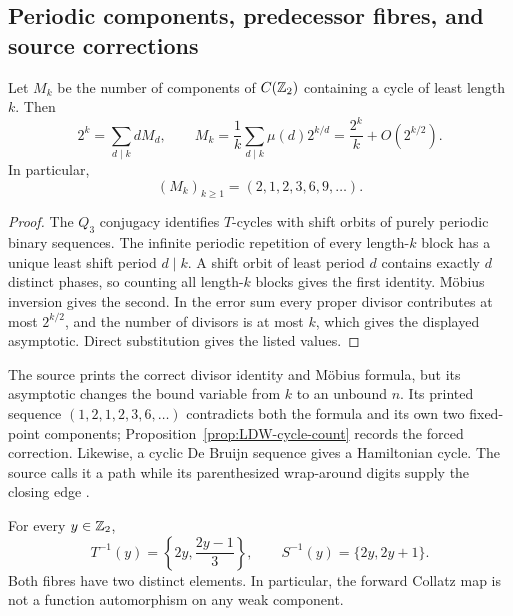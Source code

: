 \subsection{Periodic components, predecessor fibres, and source corrections}

\begin{proposition}
\label{prop:LDW-cycle-count}
Let $M_k$ be the number of components of $C(\mathbb{Z}_{2})$ containing a cycle of
least length $k$.  Then
\begin{equation}
\label{eq:LDW-cycle-count}
 2^k=\sum_{d\mid k}dM_d,
 \qquad
 M_k=\frac1k\sum_{d\mid k}\mu(d)2^{k/d}
 =\frac{2^k}{k}+O(2^{k/2}).
\end{equation}
In particular,
\[
 (M_k)_{k\geq1}=(2,1,2,3,6,9,\ldots).
\]
\end{proposition}

\begin{proof}
The $Q_3$ conjugacy identifies $T$-cycles with shift orbits of purely
periodic binary sequences.  The infinite periodic repetition of every
length-$k$ block has a unique least shift period $d\mid k$.  A shift orbit of
least period $d$ contains exactly $d$ distinct phases, so counting all
length-$k$ blocks gives the first identity.
M\"obius inversion gives the second.  In the error sum every proper divisor
contributes at most $2^{k/2}$, and the number of divisors is at most $k$, which
gives the displayed asymptotic.  Direct substitution gives the listed values.
\end{proof}

The source prints the correct divisor identity and M\"obius formula, but its
asymptotic changes the bound variable from $k$ to an unbound $n$.  Its printed
sequence $(1,2,1,2,3,6,\ldots)$ contradicts both the formula and its own two
fixed-point components; Proposition~\ref{prop:LDW-cycle-count} records the
forced correction.  Likewise, a cyclic De Bruijn sequence gives a Hamiltonian
cycle.  The source calls it a path while its parenthesized wrap-around digits
supply the closing edge \cite[Secs.~2 and 4]{LaarhovenDeWeger2012}.

\begin{proposition}
\label{prop:LDW-predecessor-fibres}
For every $y\in\mathbb{Z}_{2}$,
\begin{equation}
\label{eq:LDW-predecessor-fibres}
 T^{-1}(y)=\left\{2y,\frac{2y-1}{3}\right\},
 \qquad
 S^{-1}(y)=\{2y,2y+1\}.
\end{equation}
Both fibres have two distinct elements.  In particular, the forward Collatz
map is not a function automorphism on any weak component.
\end{proposition}

